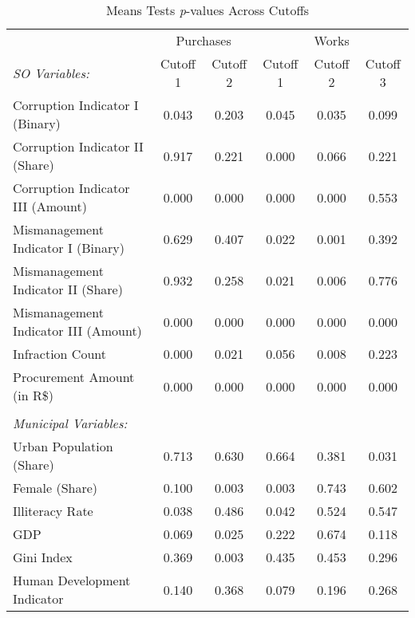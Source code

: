 \begin{table}[!htbp]
\centering
\caption{\label{tab:covariates} Means Tests \emph{p}-values Across Cutoffs}
\scriptsize
  \begin{tabular}{lcc@{\extracolsep{4pt}}ccc}
  \hline

  \hline
  & \multicolumn{2}{c}{Purchases} & \multicolumn{3}{c}{Works} \T \B \\
  \cline{2-3} \cline{4-6}
  \emph{SO Variables:} & Cutoff 1 & Cutoff 2 & Cutoff 1 & Cutoff 2 & Cutoff 3 \T \B \\
  \hline
  Corruption Indicator I (Binary)      & 0.043 & 0.203 & 0.045 & 0.035 & 0.099 \T \B \\
  Corruption Indicator II (Share)      & 0.917 & 0.221 & 0.000 & 0.066 & 0.221 \T \B \\
  Corruption Indicator III (Amount)    & 0.000 & 0.000 & 0.000 & 0.000 & 0.553 \T \B \\
  Mismanagement Indicator I (Binary)   & 0.629 & 0.407 & 0.022 & 0.001 & 0.392 \T \B \\
  Mismanagement Indicator II (Share)   & 0.932 & 0.258 & 0.021 & 0.006 & 0.776 \T \B \\
  Mismanagement Indicator III (Amount) & 0.000 & 0.000 & 0.000 & 0.000 & 0.000 \T \B \\
  Infraction Count                     & 0.000 & 0.021 & 0.056 & 0.008 & 0.223 \T \B \\
  Procurement Amount (in R\$)          & 0.000 & 0.000 & 0.000 & 0.000 & 0.000 \T \B \\
  & & & & & \\
  \emph{Municipal Variables:}          & & & & & \\
  \hline
  Urban Population (Share)             & 0.713 & 0.630 & 0.664 & 0.381 & 0.031 \T \B \\
  Female (Share)                       & 0.100 & 0.003 & 0.003 & 0.743 & 0.602 \T \B \\
  Illiteracy Rate                      & 0.038 & 0.486 & 0.042 & 0.524 & 0.547 \T \B \\
  GDP                                  & 0.069 & 0.025 & 0.222 & 0.674 & 0.118 \T \B \\
  Gini Index                           & 0.369 & 0.003 & 0.435 & 0.453 & 0.296 \T \B \\
  Human Development Indicator          & 0.140 & 0.368 & 0.079 & 0.196 & 0.268 \T \B \\

\end{tabular}
\end{table}
